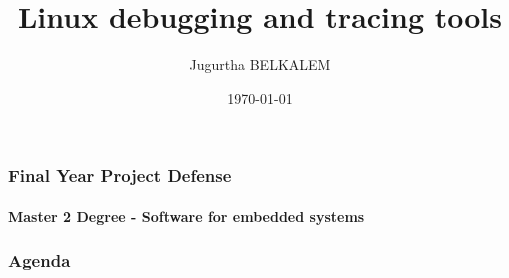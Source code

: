 \documentclass[11pt]{beamer}
\title[Journey from userspace to kernel-land]{Linux debugging and tracing tools}
\author{Jugurtha BELKALEM}
\institute{SMILE - Opensource solution}
\date{\today}
\begin{document}

\begin{frame}[plain]
\frametitle{Final Year Project Defense}
\framesubtitle{Master 2 Degree - Software for embedded systems}
\titlepage
\end{frame}


\AtBeginSection[]

{

  \begin{frame}[plain]

  \frametitle{Agenda}


  \end{frame} 

}
\end{document}

